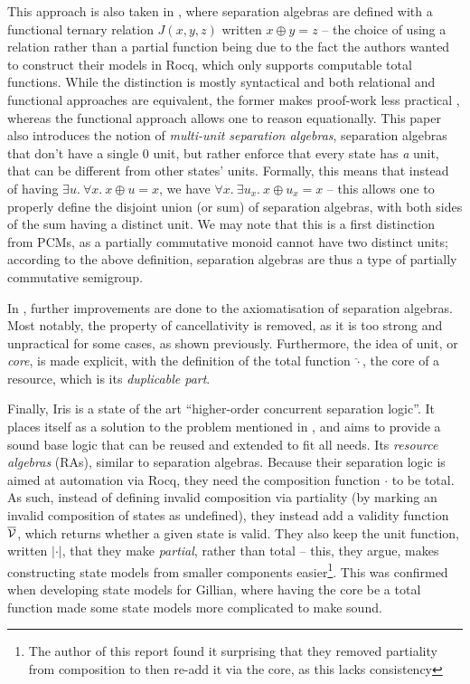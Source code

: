This approach is also taken in \cite{sepalgebra}, where separation algebras are defined with a functional ternary relation $J(x,y,z)$ written $x\oplus y=z$ -- the choice of using a relation rather than a partial function being due to the fact the authors wanted to construct their models in Rocq, which only supports computable total functions. While the distinction is mostly syntactical and both relational and functional approaches are equivalent, the former makes proof-work less practical \cite{statesoundness, iris}, whereas the functional approach allows one to reason equationally. This paper also introduces the notion of \emph{multi-unit separation algebras}, separation algebras that don't have a single $0$ unit, but rather enforce that every state has \emph{a} unit, that can be different from other states' units. Formally, this means that instead of having $\exists u.~\forall x.~x \oplus u = x$, we have $\forall x.~\exists u_x.~ x\oplus u_x=x$ -- this allows one to properly define the disjoint union (or sum) of separation algebras, with both sides of the sum having a distinct unit. We may note that this is a first distinction from PCMs, as a partially commutative monoid cannot have two distinct units; according to the above definition, separation algebras are thus a type of partially commutative semigroup.

In \cite{statesoundness}, further improvements are done to the axiomatisation of separation algebras. Most notably, the property of cancellativity is removed, as it is too strong and unpractical for some cases, as shown previously. Furthermore, the idea of unit, or \emph{core}, is made explicit, with the definition of the total function $\hat\cdot$, the core of a resource, which is its \emph{duplicable part}.

Finally, Iris \cite{iris} is a state of the art ``higher-order concurrent separation logic''. It places itself as a solution to the problem mentioned in \cite{next700seplogics}, and aims to provide a sound base logic that can be reused and extended to fit all needs. Its \emph{resource algebras} (RAs), similar to separation algebras. Because their separation logic is aimed at automation via Rocq, they need the composition function $\cdot$ to be total. As such, instead of defining invalid composition via partiality (by marking an invalid composition of states as undefined), they instead add a validity function $\cal\overline V$, which returns whether a given state is valid. They also keep the unit function, written $|\cdot|$, that they make \emph{partial}, rather than total -- this, they argue, makes constructing state models from smaller components easier\footnote{The author of this report found it surprising that they removed partiality from composition to then re-add it via the core, as this lacks consistency}. This was confirmed when developing state models for Gillian, where having the core be a total function made some state models more complicated to make sound.

